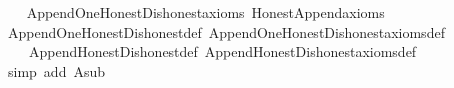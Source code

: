 \begin{isabellebody}
%
\isadelimproof
\ \ %
\endisadelimproof
%
\isatagproof
{}\isamarkupfalse%
\ Append{\isacharunderscore}{\kern0pt}One{\isacharunderscore}{\kern0pt}Honest{\isacharunderscore}{\kern0pt}Dishonest{\isacharunderscore}{\kern0pt}axioms\ Honest{\isacharunderscore}{\kern0pt}Append{\isacharunderscore}{\kern0pt}axioms\isanewline
\ \ \isamarkupfalse%
\ Append{\isacharunderscore}{\kern0pt}One{\isacharunderscore}{\kern0pt}Honest{\isacharunderscore}{\kern0pt}Dishonest{\isacharunderscore}{\kern0pt}def\ Append{\isacharunderscore}{\kern0pt}One{\isacharunderscore}{\kern0pt}Honest{\isacharunderscore}{\kern0pt}Dishonest{\isacharunderscore}{\kern0pt}axioms{\isacharunderscore}{\kern0pt}def\ \isanewline
\ \ \ \ Append{\isacharunderscore}{\kern0pt}Honest{\isacharunderscore}{\kern0pt}Dishonest{\isacharunderscore}{\kern0pt}def\ Append{\isacharunderscore}{\kern0pt}Honest{\isacharunderscore}{\kern0pt}Dishonest{\isacharunderscore}{\kern0pt}axioms{\isacharunderscore}{\kern0pt}def\ \isanewline
\ \ \isamarkupfalse%
\ {\isacharparenleft}{\kern0pt}simp\ add{\isacharcolon}{\kern0pt}\ A{}{\isacharunderscore}{\kern0pt}sub{\isacharparenright}{\kern0pt}%
\endisatagproof
{\isafoldproof}%
%
\isadelimproof
\isanewline
%
\endisadelimproof
\isanewline
%
\isadelimtheory
\isanewline
%
\endisadelimtheory
%
\isatagtheory
{}\isamarkupfalse%
%
\endisatagtheory
{\isafoldtheory}%
%
\isadelimtheory
%
\endisadelimtheory
%
\end{isabellebody}%
\endinput
